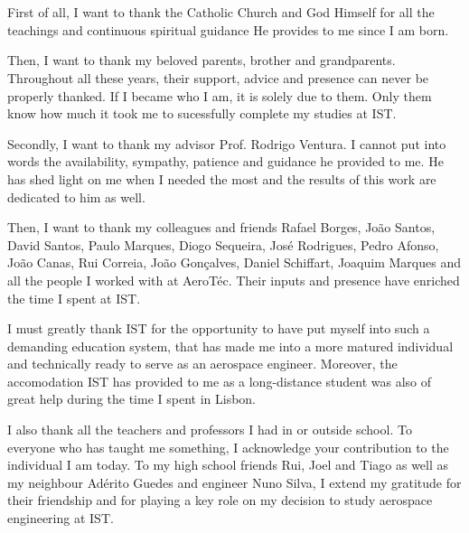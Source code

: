 
\section*{\acknowledgments}


First of all, I want to thank the Catholic Church and God Himself for all the teachings and continuous spiritual guidance He provides to me since I am born.

Then, I want to thank my beloved parents, brother and grandparents. Throughout all these years, their support, advice and presence can never be properly thanked. If I became who I am, it is solely due to them. Only them know how much it took me to sucessfully complete my studies at IST. 

Secondly, I want to thank my advisor Prof. Rodrigo Ventura. I cannot put into words the availability, sympathy, patience and guidance he provided to me. He has shed light on me when I needed the most and the results of this work are dedicated to him as well.

Then, I want to thank my colleagues and friends Rafael Borges, João Santos, David Santos, Paulo Marques, Diogo Sequeira, José Rodrigues, Pedro Afonso, João Canas, Rui Correia, João Gonçalves, Daniel Schiffart, Joaquim Marques and all the people I worked with at AeroTéc. Their inputs and presence have enriched the time I spent at IST.

I must greatly thank IST for the opportunity to have put myself into such a demanding education system, that has made me into a more matured individual and technically ready to serve as an aerospace engineer. Moreover, the accomodation IST has provided to me as a long-distance student was also of great help during the time I spent in Lisbon.

I also thank all the teachers and professors I had in or outside school. To everyone who has taught me something, I acknowledge your contribution to the individual I am today. To my high school friends Rui, Joel and Tiago as well as my neighbour Adérito Guedes and engineer Nuno Silva, I extend my gratitude for their friendship and for playing a key role on my decision to study aerospace engineering at IST.

